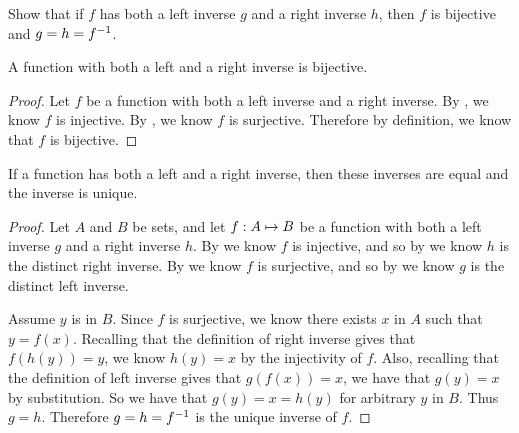 \documentclass[main.tex]{subfiles}
\begin{document}
\subproblem{}\label{s2p5e}

Show that if \(f\) has both a left inverse \(g\) and a right inverse \(h\), then
\(f\) is bijective and \(g = h = {f}^{-1}\).

\begin{thm}
	A function with both a left and a right inverse is bijective.
\end{thm}
\begin{proof}
	Let \(f\) be a function with both a left inverse and a right inverse. By
	, we know \(f\) is injective. By , we know
	\(f\) is surjective. Therefore by definition, we know that \(f\) is
	bijective.
\end{proof}

\begin{thm}
	If a function has both a left and a right inverse, then these inverses
	are equal and the inverse is unique.
\end{thm}
\begin{proof}
	Let \(A\) and \(B\) be sets, and let \({f}: {A} \mapsto{} {B}\) be a function
	with both a left inverse \(g\) and a right inverse \(h\). By
	 we know \(f\) is injective, and so by  we
	know \(h\) is the distinct right inverse. By  we know
	\(f\) is surjective, and so by  we know \(g\) is the
	distinct left inverse.

	Assume \(y\) is in \(B\). Since \(f\) is surjective, we know there
	exists \(x\) in \(A\) such that \(y = f(x)\). Recalling that the
	definition of right inverse gives that \(f(h(y)) = y\), we know
	\(h(y) = x\) by the injectivity of \(f\). Also, recalling that the
	definition of left inverse gives that \(g(f(x)) = x\), we have that
	\(g(y) = x\) by substitution. So we have that \(g(y) = x = h(y)\) for
	arbitrary \(y\) in \(B\). Thus \(g = h\). Therefore
	\(g = h = {f}^{-1}\) is the unique inverse of \(f\).
\end{proof}
\end{document}
